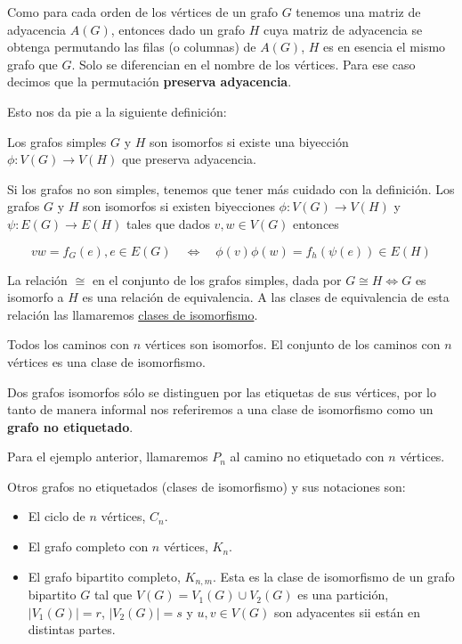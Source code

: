 Como para cada orden de los vértices de un grafo $G$ tenemos una matriz de adyacencia $A(G)$, entonces dado un grafo $H$ cuya matriz de adyacencia se obtenga permutando las filas (o columnas) de $A(G)$, $H$ es en esencia el mismo grafo que $G$. Solo se diferencian en el nombre de los vértices. Para ese caso decimos que la permutación \textbf{preserva adyacencia}.

Esto nos da pie a la siguiente definición:

\begin{defn}
    Los grafos simples $G$ y $H$ son isomorfos si existe una biyección $\phi: V(G) \rightarrow V(H)$ que preserva adyacencia.
    
    Si los grafos no son simples, tenemos que tener más cuidado con la definición. Los grafos $G$ y $H$ son isomorfos si existen biyecciones $\phi: V(G) \rightarrow V(H)$ y $\psi: E(G) \rightarrow E(H)$ tales que dados $v, w \in V(G)$ entonces
    
    \[
    vw = f_G(e), e \in E(G) \quad \iff \quad \phi(v)\phi(w) = f_h(\psi(e)) \in E(H)
    \]
\end{defn}

\begin{nota}
    La relación $\cong$ en el conjunto de los grafos simples, dada por $G \cong H \iff G$ es isomorfo a $H$ es una relación de equivalencia. A las clases de equivalencia de esta relación las llamaremos \ul{clases de isomorfismo}.
\end{nota}

\begin{ejem}
    Todos los caminos con $n$ vértices son isomorfos. El conjunto de los caminos con $n$ vértices es una clase de isomorfismo.
\end{ejem}

\begin{nota}
    Dos grafos isomorfos sólo se distinguen por las etiquetas de sus vértices, por lo tanto de manera informal nos referiremos a una clase de isomorfismo como un \textbf{grafo no etiquetado}.
    
    Para el ejemplo anterior, llamaremos $P_n$ al camino no etiquetado con $n$ vértices.
\end{nota}

Otros grafos no etiquetados (clases de isomorfismo) y sus notaciones son:

\begin{itemize}
    \item El ciclo de $n$ vértices, $C_n$.
    \item El grafo completo con $n$ vértices, $K_n$.
    \item El grafo bipartito completo, $K_{n,m}$. Esta es la clase de isomorfismo de un grafo bipartito $G$ tal que $V(G) = V_1(G) \cup V_2(G)$ es una partición, $|V_1(G)| = r$, $|V_2(G)| = s$ y $u, v \in V(G)$ son adyacentes sii están en distintas partes.
\end{itemize}

